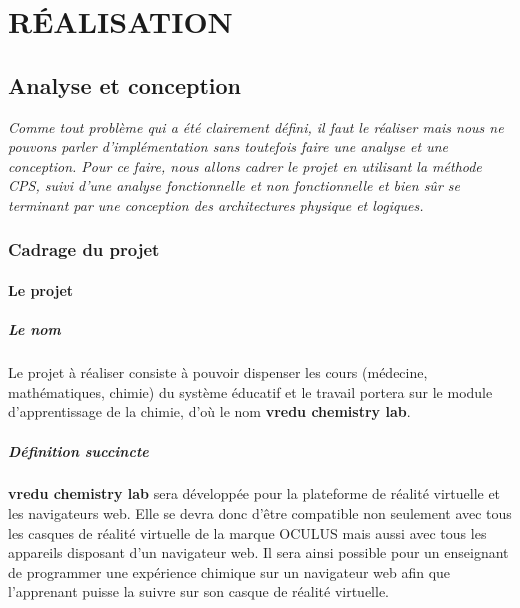 \part{RÉALISATION}

\chapter{Analyse et conception}

\textit{Comme tout problème qui a été clairement défini, il faut le réaliser mais nous ne pouvons
	parler d’implémentation sans toutefois faire une analyse et une conception. Pour ce faire,
	nous allons cadrer le projet en utilisant la méthode CPS, suivi d’une analyse
	fonctionnelle et non fonctionnelle et bien sûr se terminant par une conception des architectures
	physique et logiques.}

\clearpage

\section{Cadrage du projet}

\subsection{Le projet}

\subsubsection{Le nom}

Le projet à réaliser consiste à pouvoir dispenser les cours (médecine, mathématiques, chimie)
du système éducatif et le travail portera sur le module d’apprentissage de la chimie, d’où le
nom \textbf{vredu chemistry lab}.

\subsubsection{Définition succincte}

\textbf{vredu chemistry lab} sera développée pour la plateforme de réalité virtuelle et les navigateurs web. Elle se devra donc d’être compatible non seulement avec tous les casques de réalité virtuelle de la marque OCULUS mais aussi avec tous les appareils disposant d’un navigateur web. Il sera ainsi possible pour un enseignant de programmer une expérience chimique sur un navigateur web afin que l'apprenant puisse la suivre sur son casque de réalité virtuelle.

